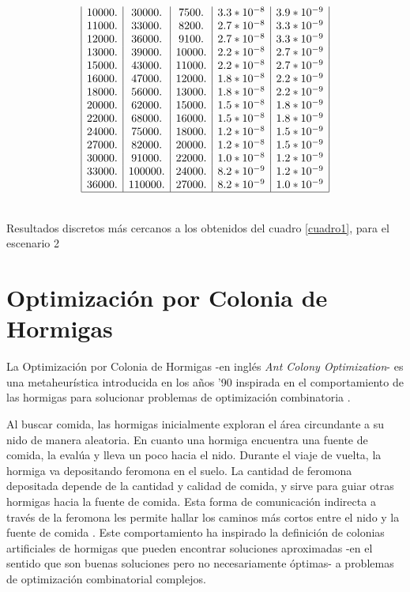 \documentclass{llncs}
\begin{document}
\begin{table}[!h]
\begin{minipage}{0.5\textwidth}
$$\begin{array}{|c|c|c|c|c|}
		10000. & 30000. & 7500. & 3.3*10^{-8} & 3.9*10^{-9} \\
		11000. & 33000. & 8200. & 2.7*10^{-8} & 3.3*10^{-9} \\
		12000. & 36000. & 9100. & 2.7*10^{-8} & 3.3*10^{-9} \\
		13000. & 39000. & 10000. & 2.2*10^{-8} & 2.7*10^{-9} \\
		15000. & 43000. & 11000. & 2.2*10^{-8} & 2.7*10^{-9} \\
		16000. & 47000. & 12000. & 1.8*10^{-8} & 2.2*10^{-9} \\
		18000. & 56000. & 13000. & 1.8*10^{-8} & 2.2*10^{-9} \\
		20000. & 62000. & 15000. & 1.5*10^{-8} & 1.8*10^{-9} \\
		22000. & 68000. & 16000. & 1.5*10^{-8} & 1.8*10^{-9} \\
		24000. & 75000. & 18000. & 1.2*10^{-8} & 1.5*10^{-9} \\
		27000. & 82000. & 20000. & 1.2*10^{-8} & 1.5*10^{-9} \\
		30000. & 91000. & 22000. & 1.0*10^{-8} & 1.2*10^{-9} \\
		33000. & 100000. & 24000. & 8.2*10^{-9} & 1.2*10^{-9} \\
		36000. & 110000. & 27000. & 8.2*10^{-9} & 1.0*10^{-9} \\
		\hline
		\end{array}
		$$
          \end{minipage} \hfill\\
          
		\caption{Resultados discretos más cercanos a los obtenidos del cuadro \ref{cuadro1}, para el escenario 2}
                \label{cuadro2}
	\end{table}	

  \section{\textbf{Optimización por Colonia de Hormigas}}
  \label{sec:acor}
  La Optimización por Colonia de Hormigas -en inglés \textit{Ant Colony Optimization}- es una metaheurística introducida en los años '90 inspirada en el comportamiento de las hormigas
  para solucionar problemas de optimización combinatoria \cite{dor92,dor:man:col,dor:schu}.
  
  Al buscar comida, las hormigas inicialmente exploran el área circundante a su nido de manera aleatoria. En cuanto una hormiga encuentra una fuente de comida, la evalúa y lleva un poco hacia el nido. Durante el viaje de vuelta, la hormiga va depositando feromona en el suelo. La cantidad de feromona depositada depende de la cantidad y calidad de comida, y sirve para guiar otras hormigas hacia la fuente de comida. Esta forma de comunicación indirecta a través de la feromona  les permite hallar los caminos más cortos entre el nido y la fuente de comida \cite{gos:aro:den:pas}. Este comportamiento ha inspirado la definición de colonias artificiales de hormigas que pueden encontrar soluciones aproximadas -en el sentido que son buenas soluciones pero no necesariamente óptimas- a problemas de optimización combinatorial complejos.
  
\end{document}
